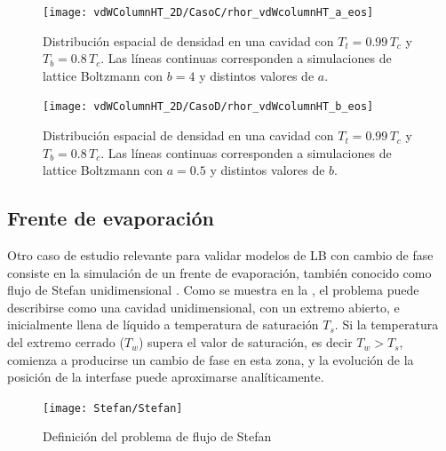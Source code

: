 \begin{figure}[ht]
	\centering
	\texttt{[image: vdWColumnHT\_2D/CasoC/rhor\_vdWcolumnHT\_a\_eos]}
	\caption{Distribuci\'on espacial de densidad en una cavidad con $T_t = 0.99 \, T_c$ y $T_b = 0.8 \, T_c$. Las l\'ineas continuas corresponden a simulaciones de lattice Boltzmann con $b=4$ y distintos valores de $a$.}
	\label{fig:vdWColumnHT_rhor_a_eos}
\end{figure}

\begin{figure}[ht]
	\centering
	\texttt{[image: vdWColumnHT\_2D/CasoD/rhor\_vdWcolumnHT\_b\_eos]}
	\caption{Distribuci\'on espacial de densidad en una cavidad con $T_t = 0.99 \, T_c$ y $T_b = 0.8 \, T_c$. Las l\'ineas continuas corresponden a simulaciones de lattice Boltzmann con $a=0.5$ y distintos valores de $b$.}
	\label{fig:vdWColumnHT_rhor_b_eos}
\end{figure}
\FloatBarrier



\subsection{Frente de evaporaci\'on}
\label{sec:stefan_d2q9}

Otro caso de estudio relevante para validar modelos de LB con cambio de fase consiste en la simulaci\'on de un frente de evaporaci\'on, tambi\'en conocido como flujo de Stefan unidimensional \cite{alexiades_mathematical_1993}. Como se muestra en la , el problema puede describirse como una cavidad unidimensional, con un extremo abierto, e inicialmente llena de l\'iquido a temperatura de saturaci\'on $T_s$. Si la temperatura del extremo cerrado ($T_w$) supera el valor de saturaci\'on, es decir $T_w > T_s$, comienza a producirse un cambio de fase en esta zona, y la evoluci\'on de la posici\'on de la interfase puede aproximarse anal\'iticamente. 

\begin{figure}[ht]
	\centering
	\texttt{[image: Stefan/Stefan]}
	\caption{Definici\'on del problema de flujo de Stefan}
	\label{fig:Stefan_cavity}
\end{figure}

